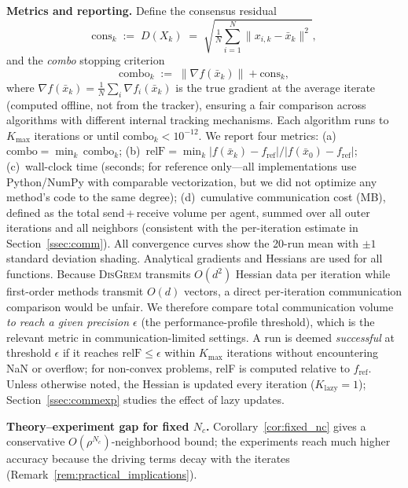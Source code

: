 \documentclass[11pt,a4paper]{article}
\def\cO{O}%
\newcommand{\cO}{\mathcal{O}}
\begin{document}
	\noindent\textbf{Metrics and reporting.}
	Define the consensus residual
	\[
	  \mathrm{cons}_k
	  \;:=\;
	  D(X_k)
	  \;=\;
	  \sqrt{\tfrac{1}{N}\textstyle\sum_{i=1}^{N}\|x_{i,k}-\bar x_k\|^{2}},
	\]
	and the \emph{combo} stopping criterion
	\[
	  \mathrm{combo}_k
	  \;:=\;
	  \|\nabla f(\bar x_k)\| + \mathrm{cons}_k,
	\]
	where $\nabla f(\bar x_k)=\frac{1}{N}\sum_{i}\nabla f_i(\bar x_k)$
	is the true gradient at the average iterate (computed offline,
	not from the tracker), ensuring a fair comparison across algorithms
	with different internal tracking mechanisms.
	Each algorithm runs to $K_{\max}$ iterations or until
	$\mathrm{combo}_k < 10^{-12}$.
	We report four metrics:
	(a)~$\mathrm{combo}=\min_k\,\mathrm{combo}_k$;
	(b)~$\mathrm{relF}=\min_k |f(\bar x_k)-f_{\mathrm{ref}}|/|f(\bar x_0)-f_{\mathrm{ref}}|$;
	(c)~wall-clock time (seconds; for reference only---all implementations
	use Python/NumPy with comparable vectorization, but we did not
	optimize any method's code to the same degree);
	(d)~cumulative communication cost (MB), defined as the total
	send\,+\,receive volume per agent, summed over all outer iterations and all
	neighbors (consistent with the per-iteration estimate in Section~\ref{ssec:comm}).
	All convergence curves show the 20-run mean with $\pm1$ standard
	deviation shading.
	Analytical gradients and Hessians are used for all functions.
	Because \textsc{DisGrem} transmits $\cO(d^2)$ Hessian data per
	iteration while first-order methods transmit $\cO(d)$ vectors,
	a direct per-iteration communication comparison would be
	unfair.
	We therefore compare total communication volume \emph{to reach
	a given precision $\epsilon$} (the performance-profile threshold),
	which is the relevant metric in communication-limited settings.
	A run is deemed \emph{successful} at threshold $\epsilon$ if it reaches
	$\mathrm{relF}\le\epsilon$ within $K_{\max}$ iterations without
	encountering NaN or overflow; for non-convex problems, relF is
	computed relative to $f_{\mathrm{ref}}$.
	Unless otherwise noted, the Hessian is updated every iteration
	($K_{\mathrm{lazy}}{=}1$); Section~\ref{ssec:commexp} studies the
	effect of lazy updates.
	
	\noindent\textbf{Theory--experiment gap for fixed $N_c$.}
	Corollary~\ref{cor:fixed_nc} gives a conservative
	$\cO(\rho^{N_c})$-neighborhood bound; the experiments reach
	much higher accuracy because the driving terms decay with the
	iterates (Remark~\ref{rem:practical_implications}).
	
\end{document}
